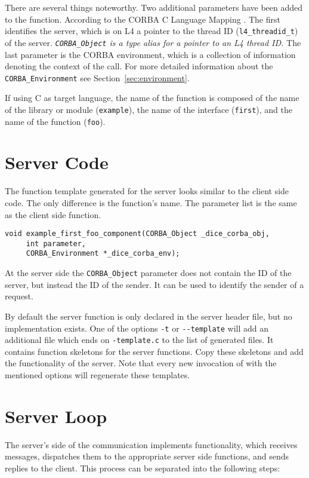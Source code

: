 There are several things noteworthy. Two additional parameters have been 
added to the function. According to the CORBA C Language
Mapping \cite{corba-clm}. The first identifies the server, which is on 
L4 a pointer to the thread ID (\verb|l4_threadid_t|) of the server.
{\em \verb|CORBA_Object| is a type alias for a pointer to an
L4 thread ID.}
The last parameter is the CORBA
environment, which is a collection of information denoting the
context of the call. For more detailed information about
the \verb|CORBA_Environment| see Section~\ref{sec:environment}.

If using C as target language, the name of the function is composed of the 
name of the library or module (\verb|example|), the name of the
interface (\verb|first|), and the name of the function (\verb|foo|).

\section{Server Code}
The function template generated for the server looks similar to the client
side code. The only difference is the function's name. The 
parameter list is the same as the client side function.

\begin{verbatim}
void example_first_foo_component(CORBA_Object _dice_corba_obj,
     int parameter,
     CORBA_Environment *_dice_corba_env);
\end{verbatim}

At the server side the \verb|CORBA_Object| parameter does not contain the ID
of the server, but instead the ID of the sender. It can be used to identify
the sender of a request.

By default the server function is only declared in the server
header file, but no implementation exists. One of the options
\verb|-t| or \verb|--template| will 
add an additional file which ends on \verb|-template.c| to
the list of generated files. It contains function skeletons for the
server functions. Copy these skeletons and add the
functionality of the server. Note that every new invocation 
of \dice{} with the mentioned options will regenerate these
templates.

\section{Server Loop}
The server's side of the communication implements
functionality, which receives messages, dispatches them to the
appropriate server side functions, and sends replies
to the client. This process can be separated into the
following steps:

